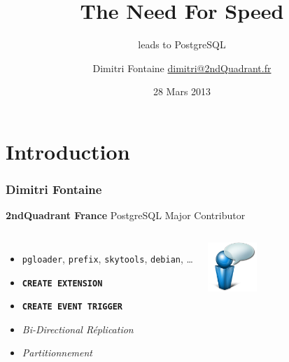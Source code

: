 \documentclass{beamer}
\title{The Need For Speed}
\subtitle{leads to PostgreSQL}
\author{Dimitri Fontaine \url{dimitri@2ndQuadrant.fr}}
\date{28 Mars 2013}
\begin{document}
\frame{\titlepage}

\section{Introduction}

\begin{frame}[fragile]
  \frametitle{Dimitri Fontaine}

  \begin{center}
    \textbf{2ndQuadrant France}
    \linebreak
    PostgreSQL Major Contributor
  \end{center}
  \vfill

\begin{columns}[c]

  \begin{itemize}
   \item<1-> \texttt{pgloader}, \texttt{prefix}, \texttt{skytools}, \texttt{debian}, …
   \item<1-> \texttt{\textbf{CREATE EXTENSION}}
   \item<2-> \texttt{\textbf{CREATE EVENT TRIGGER}}
   \item<3-> \textit{Bi-Directional Réplication}
   \item<4-> \textit{Partitionnement}
  \end{itemize}  

\begin{center}
  \includegraphics[height=5em]{bulle-blue-icon.png}
\end{center}
\end{columns}
\end{frame}
\end{document}
